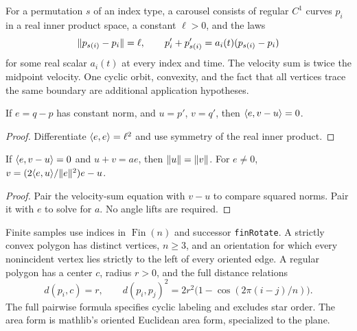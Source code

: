 \begin{definition}[Carousel]
\label{def:carousel}
\leanok
For a permutation $s$ of an index type, a carousel consists of regular
$C^1$ curves $p_i$ in a real inner product space, a constant $\ell>0$, and
the laws
\[
 \lVert p_{s(i)}-p_i\rVert=\ell,\qquad
 p_i'+p_{s(i)}'=a_i(t)(p_{s(i)}-p_i)
\]
for some real scalar $a_i(t)$ at every index and time. The velocity sum is
twice the midpoint velocity. One cyclic orbit, convexity, and the fact that
all vertices trace the same boundary are additional application hypotheses.
\end{definition}

\begin{lemma}
\label{lem:orthogonal}
\leanok
If $e=q-p$ has constant norm, and $u=p'$, $v=q'$, then $\langle e,v-u\rangle=0$.
\end{lemma}
\begin{proof}
\leanok
Differentiate $\langle e,e\rangle=\ell^2$ and use symmetry of the real inner product.
\end{proof}

\begin{lemma}
\label{lem:reflection}
\leanok
If $\langle e,v-u\rangle=0$ and $u+v=ae$, then $\lVert u\rVert=\lVert v\rVert$.
For $e\neq0$, $v=(2\langle e,u\rangle/\lVert e\rVert^2)e-u$.
\end{lemma}
\begin{proof}
\leanok
Pair the velocity-sum equation with $v-u$ to compare squared norms.
Pair it with $e$ to solve for $a$. No angle lifts are required.
\end{proof}

\begin{definition}
\label{def:polygon-geometry}
\leanok
{}
Finite samples use indices in $\operatorname{Fin}(n)$ and successor
\texttt{finRotate}. A strictly convex polygon has distinct vertices, $n\geq3$,
and an orientation for which every nonincident vertex lies strictly to the
left of every oriented edge. A regular polygon has a center $c$, radius
$r>0$, and the full distance relations
\[
 d(p_i,c)=r,\qquad d(p_i,p_j)^2=
 2r^2\bigl(1-\cos(2\pi(i-j)/n)\bigr).
\]
The full pairwise formula specifies cyclic labeling and excludes star order.
The area form is mathlib's oriented Euclidean area form, specialized to the plane.
\end{definition}

